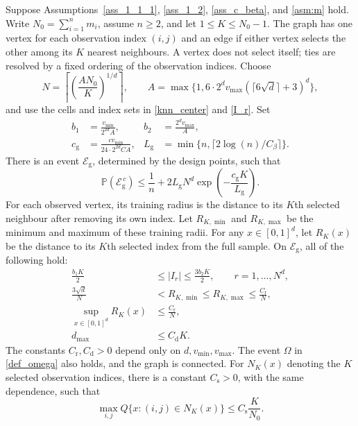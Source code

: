 \documentclass[twoside,11pt]{article}
\newenvironment{revision}{\color{revisionred}}{}
\begin{document}
\begin{revision}
\begin{lemma}
\label{Lemma_13}
\label{lemma_14}
Suppose Assumptions~\ref{ass_1_1_1}, \ref{ass_1_2},
\ref{ass_c_beta}, and \ref{asm:m} hold. Write
$N_0=\sum_{i=1}^n m_i$, assume $n\geq2$, and let
$1\leq K\leq N_0-1$. The graph has one vertex for each observation
index $(i,j)$ and an edge if either vertex selects the other among
its $K$ nearest neighbours. A vertex does not select itself; ties
are resolved by a fixed ordering of the observation indices.
Choose
\begin{equation}
\label{eq:N_definition}
N=\left\lceil\left(\frac{A N_0}{K}\right)^{1/d}\right\rceil,
\qquad
A=\max\{1,6\cdot2^d v_{\max}(\lceil6\sqrt d\rceil+3)^d\},
\end{equation}
and use the cells and index sets in \eqref{knn_center} and \eqref{I_r}.
Set
\begin{align}
\label{eq_knn_geometry_constants}
b_1&=\frac{v_{\min}}{2^{2d}A},&
b_2&=\frac{2^d v_{\max}}{A},\\
c_{\mathrm g}&=\frac{c v_{\min}}{24\cdot2^{2d}CA},&
L_{\mathrm g}&=\min\{n,\lceil2\log(n)/C_\beta\rceil\}.
\nonumber
\end{align}
There is an event $\mathcal E_{\mathrm g}$, determined by the
design points, such that
\begin{equation}
\label{eq_knn_geometry_failure}
\mathbb P(\mathcal E_{\mathrm g}^{\,c})
\leq\frac1n+2L_{\mathrm g}N^d
             \exp\left(-\frac{c_{\mathrm g}K}{L_{\mathrm g}}\right).
\end{equation}
For each observed vertex, its training radius is the distance to
its $K$th selected neighbour after removing its own index.
Let $R_{K,\min}$ and $R_{K,\max}$ be the minimum and maximum
of these training radii. For any $x\in[0,1]^d$, let $R_K(x)$
be the distance to its $K$th selected index from the full sample.
On $\mathcal E_{\mathrm g}$, all of the following hold:
\begin{align}
\label{eq_knn_geometry_counts}
\frac{b_1 K}{2}
&\leq |I_r|\leq\frac{3b_2 K}{2},
 \qquad r=1,\ldots,N^d,\\
\label{eq_knn_geometry_radii}
\frac{3\sqrt d}{N}
&<R_{K,\min}\leq R_{K,\max}\leq\frac{C_{\mathrm r}}{N},
\\
\sup_{x\in[0,1]^d}R_K(x)
&\leq\frac{C_{\mathrm r}}{N},
\nonumber\\
\label{eq:d_max_bound}
d_{\max}&\leq C_{\mathrm d}K.
\end{align}
The constants $C_{\mathrm r},C_{\mathrm d}>0$
depend only on $d,v_{\min},v_{\max}$. The event $\Omega$ in
\eqref{def_omega} also holds, and the graph is connected.
For $N_K(x)$ denoting the $K$ selected observation indices, there
is a constant $C_{\mathrm s}>0$, with the same dependence, such that
\begin{equation}
\label{eq_knn_geometry_selection}
\max_{i,j}Q\{x:(i,j)\in N_K(x)\}
\leq C_{\mathrm s}\frac{K}{N_0}.
\end{equation}
\end{lemma}


\end{revision}
\end{document}
